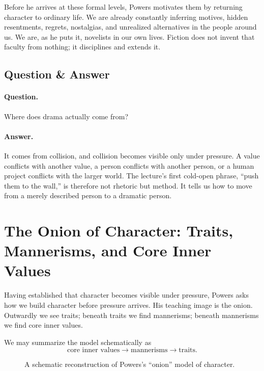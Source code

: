 Before he arrives at these formal levels, Powers motivates them by returning character to ordinary life. We are already constantly inferring motives, hidden resentments, regrets, nostalgias, and unrealized alternatives in the people around us. We are, as he puts it, novelists in our own lives. Fiction does not invent that faculty from nothing; it disciplines and extends it.

\subsection{Question \& Answer}

\paragraph{Question.} Where does drama actually come from?

\paragraph{Answer.} It comes from collision, and collision becomes visible only under pressure. A value conflicts with another value, a person conflicts with another person, or a human project conflicts with the larger world. The lecture's first cold-open phrase, ``push them to the wall,'' is therefore not rhetoric but method. It tells us how to move from a merely described person to a dramatic person.

\section{The Onion of Character: Traits, Mannerisms, and Core Inner Values}

Having established that character becomes visible under pressure, Powers asks how we build character before pressure arrives. His teaching image is the onion. Outwardly we see traits; beneath traits we find mannerisms; beneath mannerisms we find core inner values.

We may summarize the model schematically as
\begin{equation}
\text{core inner values} \to \text{mannerisms} \to \text{traits}.
\end{equation}

\begin{figure}[h]
\centering
{}
\caption{A schematic reconstruction of Powers's ``onion'' model of character.}
\end{figure}

